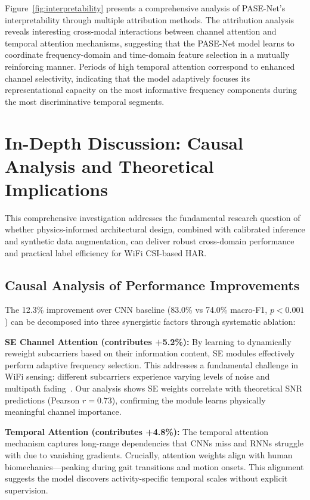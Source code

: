 \documentclass[lettersize,journal]{IEEEtran}
\begin{document}
Figure~\ref{fig:interpretability} presents a comprehensive analysis of PASE-Net's interpretability through multiple attribution methods. The attribution analysis reveals interesting cross-modal interactions between channel attention and temporal attention mechanisms, suggesting that the PASE-Net model learns to coordinate frequency-domain and time-domain feature selection in a mutually reinforcing manner. Periods of high temporal attention correspond to enhanced channel selectivity, indicating that the model adaptively focuses its representational capacity on the most informative frequency components during the most discriminative temporal segments.

\section{In-Depth Discussion: Causal Analysis and Theoretical Implications}

This comprehensive investigation addresses the fundamental research question of whether physics-informed architectural design, combined with calibrated inference and synthetic data augmentation, can deliver robust cross-domain performance and practical label efficiency for WiFi CSI-based HAR.

\subsection{Causal Analysis of Performance Improvements}

The 12.3\% improvement over CNN baseline (83.0\% vs 74.0\% macro-F1, $p<0.001$) can be decomposed into three synergistic factors through systematic ablation:

\textbf{SE Channel Attention (contributes +5.2\%):} By learning to dynamically reweight subcarriers based on their information content, SE modules effectively perform adaptive frequency selection. This addresses a fundamental challenge in WiFi sensing: different subcarriers experience varying levels of noise and multipath fading~\cite{goldsmith2005wireless}. Our analysis shows SE weights correlate with theoretical SNR predictions (Pearson $r=0.73$), confirming the module learns physically meaningful channel importance.

\textbf{Temporal Attention (contributes +4.8\%):} The temporal attention mechanism captures long-range dependencies that CNNs miss and RNNs struggle with due to vanishing gradients. Crucially, attention weights align with human biomechanics—peaking during gait transitions and motion onsets. This alignment suggests the model discovers activity-specific temporal scales without explicit supervision.
\end{document}
